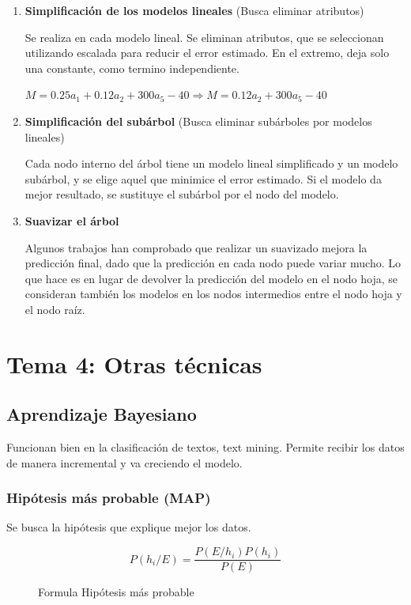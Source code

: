\documentclass[12pt, twoside, openright]{report} %
\begin{document}
\begin{enumerate}
	\def\labelenumi{\arabic{enumi}.}
	\item \textbf{Simplificación de los modelos lineales} (Busca eliminar
	      atributos)

	      Se realiza en cada modelo lineal. Se eliminan atributos, que se seleccionan utilizando escalada para reducir el error estimado. En el extremo, deja solo una constante, como termino independiente.

	      \(M= 0.25a_1+0.12a_2+300a_5-40 \Rightarrow M=0.12a_2+300a_5-40\)
	\item \textbf{Simplificación del subárbol} (Busca eliminar subárboles por modelos
	      lineales)

	      Cada nodo interno del árbol tiene un modelo lineal simplificado y un
	      modelo subárbol, y se elige aquel que minimice el error estimado. Si
	      el modelo da mejor resultado, se sustituye el subárbol por el nodo del
	      modelo.
	\item \textbf{Suavizar el árbol}

	      Algunos trabajos han comprobado que realizar un suavizado mejora la predicción final, dado que la predicción en cada nodo puede variar
	      mucho. Lo que hace es en lugar de devolver la predicción del modelo en
	      el nodo hoja, se consideran también los modelos en los nodos
	      intermedios entre el nodo hoja y el nodo raíz.
\end{enumerate}

\chapter{Tema 4: Otras técnicas}

\section{Aprendizaje Bayesiano}

Funcionan bien en la clasificación de textos, text mining. Permite
recibir los datos de manera incremental y va creciendo el modelo.

\subsection{Hipótesis más probable
	(MAP)}

Se busca la hipótesis que explique mejor los datos.
\begin{figure}[H]
	\[P(h_i/E)= \frac {P(E/h_i)P(h_i)}{P(E)}\]
	\captionsetup{justification=centering}
	\caption{Formula Hipótesis más probable}
\end{figure}
\end{document}

